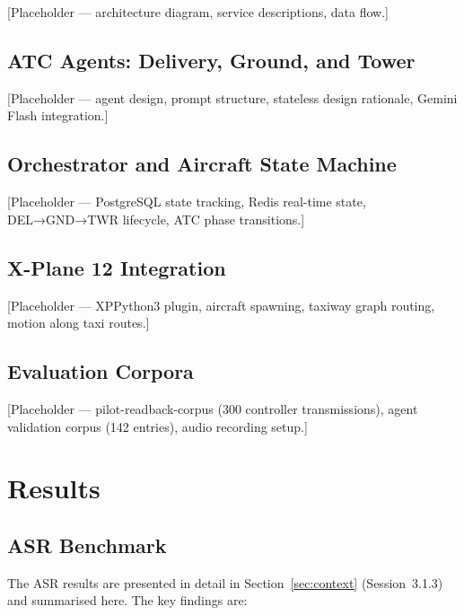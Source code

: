 \documentclass[computers,article,submit,moreauthors,pdftex]{Definitions/mdpi}
\begin{document}
[Placeholder — architecture diagram, service descriptions, data flow.]


\subsection{ATC Agents: Delivery, Ground, and Tower}
\label{sec:agents}

[Placeholder — agent design, prompt structure, stateless design rationale,
Gemini Flash integration.]

\subsection{Orchestrator and Aircraft State Machine}
\label{sec:orchestrator}

[Placeholder — PostgreSQL state tracking, Redis real-time state,
DEL→GND→TWR lifecycle, ATC phase transitions.]

\subsection{X-Plane 12 Integration}
\label{sec:xplane}

[Placeholder — XPPython3 plugin, aircraft spawning, taxiway graph routing,
motion along taxi routes.]

\subsection{Evaluation Corpora}
\label{sec:corpora}

[Placeholder — pilot-readback-corpus (300 controller transmissions),
agent validation corpus (142 entries), audio recording setup.]

\section{Results}
\label{sec:results}

\subsection{ASR Benchmark}

The ASR results are presented in detail in Section~\ref{sec:context}
(Session~3.1.3) and summarised here. The key findings are:
\end{document}
